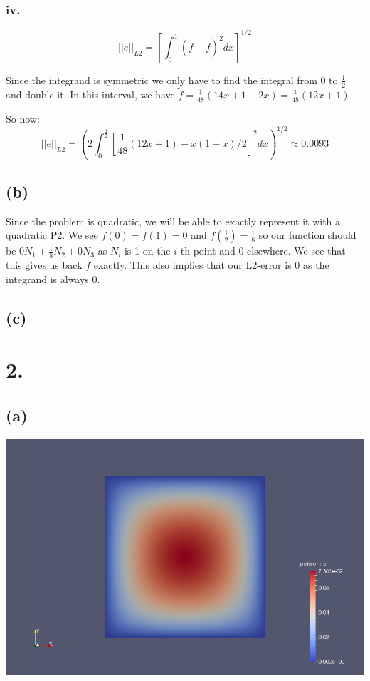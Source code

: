 \documentclass{article}
\begin{document}
\subsubsection*{iv.}
\begin{equation}
||e||_{L2}=\left[\int_0^1(\tilde f-f)^2dx\right]^{1/2}
\end{equation}

Since the integrand is symmetric we only have to find the integral from 0 to $\frac{1}{2}$ and double it. In this interval, we have $\tilde f=\frac{1}{48}(14x+1-2x)=\frac{1}{48}(12x+1)$.

So now:
\begin{equation}
||e||_{L2}=\left(2\int_0^{\frac{1}{2}}\left[\frac{1}{48}(12x+1)-x(1-x)/2\right]^2dx\right)^{1/2}\approx 0.0093
\end{equation}

\subsection*{(b)}
Since the problem is quadratic, we will be able to exactly represent it with a quadratic P2. We see $f(0)=f(1)=0$ and $f(\frac{1}{2})=\frac{1}{8}$ so our function should be $0N_1+\frac{1}{8}N_2+0N_3$ as $N_i$ is 1 on the $i$-th point and 0 elsewhere. We see that this gives us back $f$ exactly. This also implies that our L2-error is 0 as the integrand is always 0.
\subsection*{(c)}
\section*{2.}
\subsection*{(a)}
\includegraphics[width=\linewidth]{2a.png}
\end{document}
